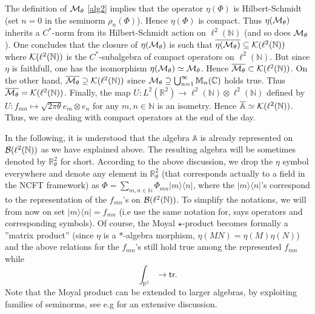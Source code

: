 \documentclass[a4paper,11pt,twoside]{article}
\numberwithin{equation}{section}
\newcommand{\tr}{\mathsf{tr}}
\theoremstyle{nonumberplain}
\begin{document}
The definition of ${\cal{M}}_\theta$ \eqref{alg2} implies that the operator $\eta(\Phi)$ is Hilbert-Schmidt (set $n=0$ in the seminorm $\rho_n(\Phi)$). Hence $\eta(\Phi)$ is compact. Thus $\eta({\cal{M}}_\theta)$ inherits a $C^*$-norm from its Hilbert-Schmidt action on $\ell^2(\mathbb{N})$ (and so does ${\cal{M}}_\theta$). One concludes that the closure of $\eta({\cal{M}}_\theta)$ is such that $\overline{\eta({\cal{M}}_\theta)}\subseteq{\cal{K}}(\ell^2(\mathbb{N}))$ where ${\cal{K}}(\ell^2(\mathbb{N}))$ is the $C^*$-subalgebra of compact operators on $\ell^2(\mathbb{N})$. But since $\eta$ is faithfull, one has the isomorphism $\eta({\cal{M}}_\theta)\simeq{\cal{M}}_\theta$. Hence $\overline{{\cal{M}}_\theta}\subset{\cal{K}}(\ell^2(\mathbb{N}))$. On the other hand, $\overline{{\cal{M}}_\theta}\supseteq{\cal{K}}(\ell^2(\mathbb{N}))$ since ${\cal{M}}_\theta\supseteq\bigcup_{n=1}^\infty{\mathbb{M}}_n(\mathbb{C})$ holds true. Thus $\overline{{\cal{M}}_\theta}={\cal{K}}(\ell^2(\mathbb{N}))$. Finally, the map $U:L^2(
\mathbb{R}^2)\to\ell^2(\mathbb{N})\otimes\ell^2(\mathbb{N})$ defined by $U:f_{mn}\mapsto {\sqrt{2\pi\theta}}e_m\otimes e_n$ for any $m,n\in\mathbb{N}$ is an isometry. Hence $\overline{{\mathbb{A}}}\simeq{\cal{K}}(\ell^2(\mathbb{N}))$. Thus, we are dealing with compact operators at the end of the day.\par

In the following, it is understood that the algebra ${\mathbb{A}}$ is already represented on ${\cal{B}}(\ell^2(\mathbb{N}))$ as we have explained above. The resulting algebra will be sometimes denoted by $\mathbb{R}^2_\theta$ for short. According to the above discussion, we drop the $\eta$ symbol everywhere and denote any element in $\mathbb{R}^2_\theta$ (that corresponds actually to a field in the NCFT framework) as $\Phi=\sum_{m,n\in\mathbb{N}}\Phi_{mn}|m\rangle\langle n|$, where the $|m\rangle\langle n|$'s correspond to the representation of the $f_{mn}$'s on ${\cal{B}}(\ell^2(\mathbb{N}))$. To simplify the notations, we will from now on set $|m\rangle\langle n|=f_{mn}$ (i.e use the same notation for, says operators and corresponding symbols). Of course, the Moyal $\star$-product becomes formally a ''matrix product'' (since $\eta$ is a $*$-algebra morphism, $\eta(MN)=\eta(M)\eta(N)$) and the above relations for the $f_{mn}$'s still hold true among the represented $f_{mn}$ while 
\begin{equation}
\int_{\mathbb{R}^2}\to\tr. \nonumber
\end{equation}
Note that the Moyal product can be extended to larger algebras, by exploiting families of seminorms, see e.g \cite{Gracia-Bondia:1987kw} for an extensive discussion.\par
\end{document}
